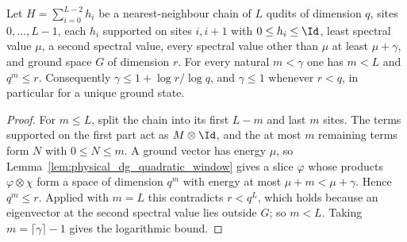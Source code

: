 \begin{lemma}
    \label{thm:physical_dg_gap_upper_bound}
    \leanok
    Let $H=\sum_{i=0}^{L-2}h_i$ be a nearest-neighbour chain of $L$ qudits of
    dimension $q$, sites $0,\dots,L-1$, each $h_i$ supported on sites $i,i+1$
    with $0\le h_i\le\Id$, least spectral value $\mu$, a second
    spectral value, every spectral value other than $\mu$ at least
    $\mu+\gamma$, and ground space $G$ of dimension $r$. For every natural
    $m<\gamma$ one has $m<L$ and $q^m\le r$. Consequently
    $\gamma\le1+\log r/\log q$, and $\gamma\le1$ whenever $r<q$, in
    particular for a unique ground state.
\end{lemma}
\begin{proof}
    \leanok
    For $m\le L$, split the chain into its first $L-m$ and last $m$ sites.
    The terms supported on the first part act as $M\otimes\Id$, and the at
    most $m$ remaining terms form $N$ with $0\le N\le m$. A ground vector has
    energy $\mu$, so Lemma~\ref{lem:physical_dg_quadratic_window} gives a
    slice $\varphi$ whose products $\varphi\otimes\chi$ form a space of
    dimension $q^m$ with energy at most $\mu+m<\mu+\gamma$. Hence $q^m\le r$.
    Applied with $m=L$ this contradicts $r<q^L$, which holds because an
    eigenvector at the second spectral value lies outside $G$; so $m<L$.
    Taking $m=\lceil\gamma\rceil-1$ gives the logarithmic bound.
\end{proof}

